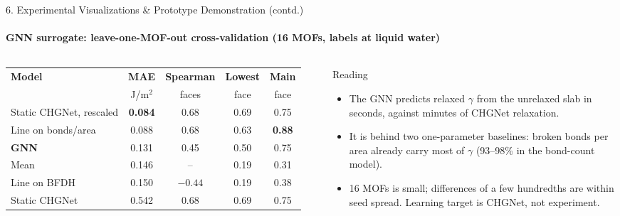 \documentclass[aspectratio=169, 11pt]{beamer}
\begin{document}
\begin{frame}[shrink=4]{6. Experimental Visualizations \& Prototype Demonstration (contd.)}
    \framesubtitle{GNN surrogate: leave-one-MOF-out cross-validation (16 MOFs, labels at liquid water)}
    \begin{columns}[c]
        \scriptsize
        \renewcommand{\arraystretch}{1.2}
        \begin{tabular}{lcccc}
            \toprule
            \textbf{Model} & \textbf{MAE} & \textbf{Spearman} & \textbf{Lowest} & \textbf{Main} \\
            & J/m$^2$ & faces & face & face \\
            \midrule
            Static CHGNet, rescaled & \textbf{0.084} & 0.68 & 0.69 & 0.75 \\
            Line on bonds/area & 0.088 & 0.68 & 0.63 & \textbf{0.88} \\
            \textbf{GNN} & 0.131 & 0.45 & 0.50 & 0.75 \\
            Mean & 0.146 & -- & 0.19 & 0.31 \\
            Line on BFDH & 0.150 & $-0.44$ & 0.19 & 0.38 \\
            Static CHGNet & 0.542 & 0.68 & 0.69 & 0.75 \\
            \bottomrule
        \end{tabular}
        \scriptsize
        \begin{block}{Reading}
            \begin{itemize}
                \item The GNN predicts relaxed $\gamma$ from the unrelaxed slab in seconds, against minutes of CHGNet relaxation.
                \item It is behind two one-parameter baselines: broken bonds per area already carry most of $\gamma$ (93--98\% in the bond-count model).
                \item 16 MOFs is small; differences of a few hundredths are within seed spread. Learning target is CHGNet, not experiment.
            \end{itemize}
        \end{block}
    \end{columns}
\end{frame}
\end{document}
